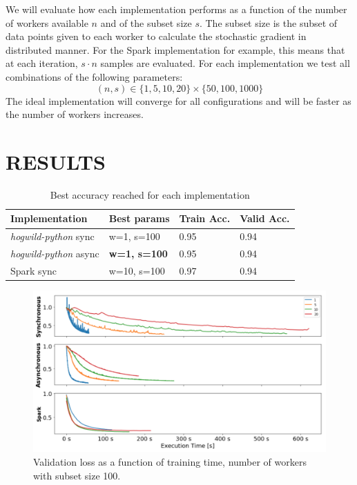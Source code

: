 \documentclass[a4paper, 11pt, conference]{ieeeconf}
\begin{document}
We will evaluate how each implementation performs as a function of the number of workers available $n$ and of the subset size $s$. The subset size is the subset of data points given to each worker to calculate the stochastic gradient in distributed manner. For the Spark implementation for example, this means that at each iteration, $s \cdot n$ samples are evaluated. For each implementation we test all combinations of the following parameters:
$$
(n, s) \in \{1, 5, 10, 20\} \times \{50, 100, 1000\}
$$
The ideal implementation will converge for all configurations and will be faster as the number of workers increases.


\addtolength{\textheight}{-1.6cm}   



\section{RESULTS} 

\begin{table}[t]
\caption{Best accuracy reached for each implementation}
\begin{tabular}{|l|l|l|l|}
\hline
Implementation & Best params & Train Acc. & Valid Acc. \\ \hline
\textit{hogwild-python} sync & w=1, s=100 & 0.95 & 0.94 \\ \hline
\textit{hogwild-python} async & \textbf{w=1, s=100} & 0.95 & 0.94 \\ \hline
Spark sync & w=10, s=100 & 0.97 & 0.94 \\ \hline
\end{tabular}
\label{accuracy}
\end{table}


\begin{figure}[t]
  \centering
  \includegraphics[scale=0.36]{worker-count.png}
  \caption{Validation loss as a function of training time, number of workers with subset size 100.}
  \label{workercount}
\end{figure}
\end{document}

